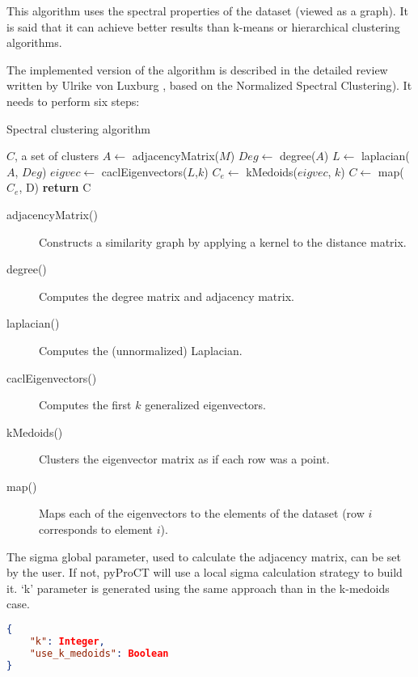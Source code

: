 This algorithm uses the spectral properties of the dataset (viewed
as a graph). It is said that it can achieve better results than k-means
or hierarchical clustering algorithms.

The implemented version of the algorithm is described in the detailed
review written by Ulrike von Luxburg \cite{luxburg_tutorial_2007},
based on the Normalized Spectral Clustering\cite{shi_normalized_2000}).
It needs to perform six steps:

\begin{algorithm}[H]
\caption{Spectral clustering algorithm}
	\begin{algorithmic}[1]
		\Output $C$, a set of clusters
		\State $A \gets$ adjacencyMatrix($M$)\;
		\State $Deg \gets$ degree($A$)\;
		\State $L \gets$ laplacian($A$, $Deg$)\;
		\State $eigvec \gets$ caclEigenvectors($L$,$k$)\;
		\State $C_e \gets$ kMedoids($eigvec$, $k$)\;
		\State $C \gets$ map($C_e$, D)\;
		\State \textbf{return} C
	\end{algorithmic}
\end{algorithm}

\begin{description}
	\item [adjacencyMatrix()] Constructs a similarity graph by applying a kernel to the distance matrix. 
	\item [degree()] Computes the degree matrix and adjacency matrix. 
	\item [laplacian()] Computes the (unnormalized) Laplacian. 
	\item [caclEigenvectors()] Computes the first $k$ generalized eigenvectors. 
	\item [kMedoids()] Clusters the eigenvector matrix as if each row was a point. 
	\item [map()] Maps each of the eigenvectors to the elements of the dataset (row $i$ corresponds to element $i$).
\end{description}


The sigma global parameter, used to calculate the adjacency matrix,
can be set by the user. If not, pyProCT will use a local sigma calculation
strategy \cite{zelnik-manor_self-tuning_2004-1} to build it. `k' parameter
is generated using the same approach than in the k-medoids case.


\begin{lstlisting}[language=json,firstnumber=1] 
{ 
	"k": Integer, 
	"use_k_medoids": Boolean 
}
\end{lstlisting}

